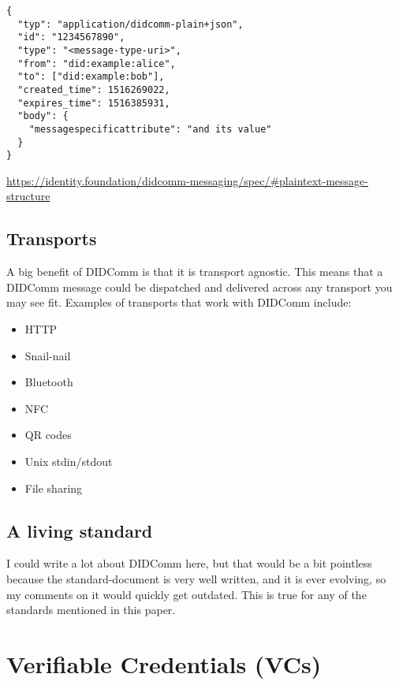 \begin{lstlisting}
{
  "typ": "application/didcomm-plain+json",
  "id": "1234567890",
  "type": "<message-type-uri>",
  "from": "did:example:alice",
  "to": ["did:example:bob"],
  "created_time": 1516269022,
  "expires_time": 1516385931,
  "body": {
    "messagespecificattribute": "and its value"
  }
} 
\end{lstlisting}

\url{https://identity.foundation/didcomm-messaging/spec/\#plaintext-message-structure}




\pagebreak




\subsection{Transports}

A big benefit of DIDComm is that it is transport agnostic. This means that a DIDComm message could be dispatched and delivered across any transport you may see fit. Examples of transports that work with DIDComm include:

\begin{itemize}
\tightlist
\item
  HTTP
\item
  Snail-nail
\item
  Bluetooth
\item
  NFC
\item
  QR codes
\item
  Unix stdin/stdout
\item
  File sharing
\end{itemize}


\subsection{A living standard}

I could write a lot about DIDComm here, but that would be a bit
pointless because the standard-document is very well written, and it is
ever evolving, so my comments on it would quickly get outdated. This is
true for any of the standards mentioned in this paper.




\hypertarget{verifiable-credentials-vcs}{%
\section{Verifiable Credentials
(VCs)}\label{verifiable-credentials-vcs}}

